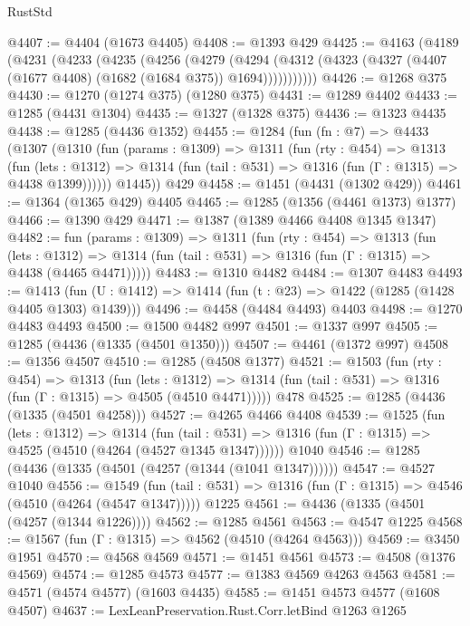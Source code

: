 \begin{lexlean}{RustStd}
\begin{coremodule}
@4407 := @4404 (@1673 @4405)
@4408 := @1393 @429
@4425 := @4163
    (@4189
      (@4231
        (@4233
          (@4235
            (@4256
              (@4279
                (@4294
                  (@4312 (@4323 (@4327 (@4407 (@1677 @4408) (@1682 (@1684 @375)) @1694)))))))))))
@4426 := @1268 @375
@4430 := @1270 (@1274 @375) (@1280 @375)
@4431 := @1289 @4402
@4433 := @1285 (@4431 @1304)
@4435 := @1327 (@1328 @375)
@4436 := @1323 @4435
@4438 := @1285 (@4436 @1352)
@4455 := @1284
    (fun (fn : @7) =>
    @4433
      (@1307
        (@1310
          (fun (params : @1309) =>
          @1311
            (fun (rty : @454) =>
            @1313
              (fun (lets : @1312) =>
              @1314 (fun (tail : @531) => @1316 (fun (Γ : @1315) => @4438 @1399))))))
        @1445))
    @429
@4458 := @1451 (@4431 (@1302 @429))
@4461 := @1364 (@1365 @429) @4405
@4465 := @1285 (@1356 (@4461 @1373) @1377)
@4466 := @1390 @429
@4471 := @1387 (@1389 @4466 @4408 @1345 @1347)
@4482 := fun (params : @1309) =>
  @1311
    (fun (rty : @454) =>
    @1313
      (fun (lets : @1312) =>
      @1314 (fun (tail : @531) => @1316 (fun (Γ : @1315) => @4438 (@4465 @4471)))))
@4483 := @1310 @4482
@4484 := @1307 @4483
@4493 := @1413 (fun (U : @1412) => @1414 (fun (t : @23) => @1422 (@1285 (@1428 @4405 @1303) @1439)))
@4496 := @4458 (@4484 @4493) @4403
@4498 := @1270 @4483 @4493
@4500 := @1500 @4482 @997
@4501 := @1337 @997
@4505 := @1285 (@4436 (@1335 (@4501 @1350)))
@4507 := @4461 (@1372 @997)
@4508 := @1356 @4507
@4510 := @1285 (@4508 @1377)
@4521 := @1503
    (fun (rty : @454) =>
    @1313
      (fun (lets : @1312) =>
      @1314 (fun (tail : @531) => @1316 (fun (Γ : @1315) => @4505 (@4510 @4471)))))
    @478
@4525 := @1285 (@4436 (@1335 (@4501 @4258)))
@4527 := @4265 @4466 @4408
@4539 := @1525
    (fun (lets : @1312) =>
    @1314
      (fun (tail : @531) => @1316 (fun (Γ : @1315) => @4525 (@4510 (@4264 (@4527 @1345 @1347))))))
    @1040
@4546 := @1285 (@4436 (@1335 (@4501 (@4257 (@1344 (@1041 @1347))))))
@4547 := @4527 @1040
@4556 := @1549
    (fun (tail : @531) => @1316 (fun (Γ : @1315) => @4546 (@4510 (@4264 (@4547 @1347)))))
    @1225
@4561 := @4436 (@1335 (@4501 (@4257 (@1344 @1226))))
@4562 := @1285 @4561
@4563 := @4547 @1225
@4568 := @1567 (fun (Γ : @1315) => @4562 (@4510 (@4264 @4563)))
@4569 := @3450 @1951
@4570 := @4568 @4569
@4571 := @1451 @4561
@4573 := @4508 (@1376 @4569)
@4574 := @1285 @4573
@4577 := @1383 @4569 @4263 @4563
@4581 := @4571 (@4574 @4577) (@1603 @4435)
@4585 := @1451 @4573 @4577 (@1608 @4507)
@4637 := LexLeanPreservation.Rust.Corr.letBind
    @1263
    @1265

\end{coremodule}
\end{lexlean}
